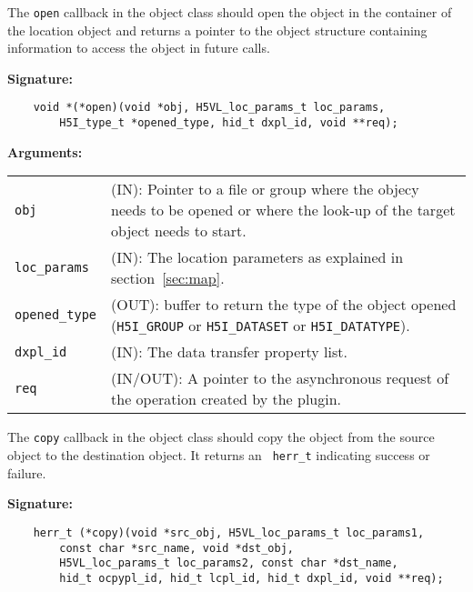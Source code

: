 The {\tt open} callback in the object class should open the object in
the container of the location object and returns a pointer to the
object structure containing information to access the object in future
calls.

\textbf{Signature:}
\begin{lstlisting}
    void *(*open)(void *obj, H5VL_loc_params_t loc_params, 
        H5I_type_t *opened_type, hid_t dxpl_id, void **req);
\end{lstlisting}

\textbf{Arguments:}\\
\begin{tabular}{l p{10cm}}
  {\tt obj} & (IN): Pointer to a file or group where the objecy needs to be
  opened or where the look-up of the target object needs to start.\\
  {\tt loc\_params} & (IN): The location parameters as explained in
  section~\ref{sec:map}.\\
  {\tt opened\_type} & (OUT): buffer to return the type of the object
  opened ({\tt H5I\_GROUP} or {\tt H5I\_DATASET} or {\tt H5I\_DATATYPE}).\\
  {\tt dxpl\_id} & (IN): The data transfer property list.\\
  {\tt req} & (IN/OUT): A pointer to the asynchronous request of the
  operation created by the plugin.\\
\end{tabular}

The {\tt copy} callback in the object class should copy the object
from the source object to the destination object. It returns an {\tt
  herr\_t} indicating success or failure.

\textbf{Signature:}
\begin{lstlisting}
    herr_t (*copy)(void *src_obj, H5VL_loc_params_t loc_params1, 
        const char *src_name, void *dst_obj, 
        H5VL_loc_params_t loc_params2, const char *dst_name,
        hid_t ocpypl_id, hid_t lcpl_id, hid_t dxpl_id, void **req);
\end{lstlisting}


